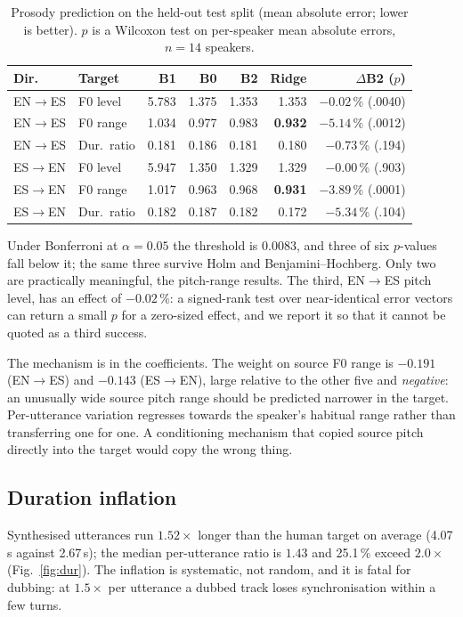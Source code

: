 \documentclass[journal]{IEEEtran}
\newcommand{\ento}{EN$\rightarrow$ES}
\newcommand{\esto}{ES$\rightarrow$EN}
\begin{document}
\begin{table}[!t]
\caption{Prosody prediction on the held-out test split (mean absolute error; lower is better).
$p$ is a Wilcoxon test on per-speaker mean absolute errors, $n=14$ speakers.}
\label{tab:ridge}
\centering
\begin{tabular}{@{}llrrrrr@{}}
\toprule
Dir. & Target & B1 & B0 & B2 & Ridge & $\Delta$B2 ($p$)\\
\midrule
\ento & F0 level  & 5.783 & 1.375 & 1.353 & 1.353 & $-0.02\,\%$ (.0040)\\
\ento & F0 range  & 1.034 & 0.977 & 0.983 & \textbf{0.932} & $-5.14\,\%$ (.0012)\\
\ento & Dur.\ ratio & 0.181 & 0.186 & 0.181 & 0.180 & $-0.73\,\%$ (.194)\\
\esto & F0 level  & 5.947 & 1.350 & 1.329 & 1.329 & $-0.00\,\%$ (.903)\\
\esto & F0 range  & 1.017 & 0.963 & 0.968 & \textbf{0.931} & $-3.89\,\%$ (.0001)\\
\esto & Dur.\ ratio & 0.182 & 0.187 & 0.182 & 0.172 & $-5.34\,\%$ (.104)\\
\bottomrule
\end{tabular}
\end{table}

Under Bonferroni at $\alpha=0.05$ the threshold is $0.0083$, and three of six $p$-values fall below
it; the same three survive Holm and Benjamini--Hochberg. Only two are practically meaningful, the
pitch-range results. The third, \ento{} pitch level, has an effect of $-0.02\,\%$: a signed-rank
test over near-identical error vectors can return a small $p$ for a zero-sized effect, and we
report it so that it cannot be quoted as a third success.

The mechanism is in the coefficients. The weight on source F0 range is $-0.191$ (\ento) and
$-0.143$ (\esto), large relative to the other five and \emph{negative}: an unusually wide source
pitch range should be predicted narrower in the target. Per-utterance variation regresses towards
the speaker's habitual range rather than transferring one for one. A conditioning mechanism that
copied source pitch directly into the target would copy the wrong thing.

\subsection{Duration inflation}
Synthesised utterances run $1.52\times$ longer than the human target on average (4.07\,s against
2.67\,s); the median per-utterance ratio is $1.43$ and 25.1\,\% exceed $2.0\times$
(Fig.~\ref{fig:dur}). The inflation is systematic, not random, and it is fatal for dubbing: at
$1.5\times$ per utterance a dubbed track loses synchronisation within a few turns.
\end{document}
